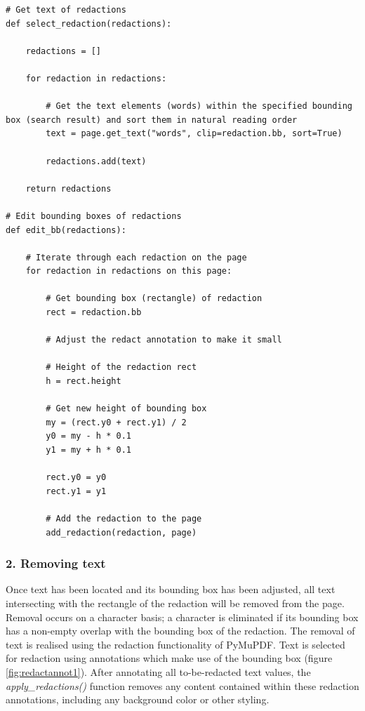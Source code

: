 \begin{lstlisting}[style=CStyle, caption=Pseudocode for labelling of text and the selection of the labels using PyMuPDF. Size of the bounding box is made smaller to prevent redaction of more than only the to-be-redacted text. This is an improvement of the original functionality of PyMuPDF which is prone to redacting more text than requested.]
# Get text of redactions
def select_redaction(redactions):

    redactions = []
    
    for redaction in redactions:
    
        # Get the text elements (words) within the specified bounding box (search result) and sort them in natural reading order
        text = page.get_text("words", clip=redaction.bb, sort=True)
        
        redactions.add(text)

    return redactions

# Edit bounding boxes of redactions
def edit_bb(redactions):

    # Iterate through each redaction on the page
    for redaction in redactions on this page:
    
        # Get bounding box (rectangle) of redaction
        rect = redaction.bb
    
        # Adjust the redact annotation to make it small
        
        # Height of the redaction rect
        h = rect.height
        
        # Get new height of bounding box
        my = (rect.y0 + rect.y1) / 2 
        y0 = my - h * 0.1
        y1 = my + h * 0.1
        
        rect.y0 = y0
        rect.y1 = y1
    
        # Add the redaction to the page
        add_redaction(redaction, page)
\end{lstlisting}

\subsubsection{2. Removing text}
Once text has been located and its bounding box has been adjusted, all text intersecting with the rectangle of the redaction will be removed from the page. Removal occurs on a character basis; a character is eliminated if its bounding box has a non-empty overlap with the bounding box of the redaction. The removal of text is realised using the redaction functionality of PyMuPDF. Text is selected for redaction using annotations which make use of the bounding box (figure \ref{fig:redactannot1}). After annotating all to-be-redacted text values, the \textit{apply\_redactions()} function removes any content contained within these redaction annotations, including any background color or other styling.

